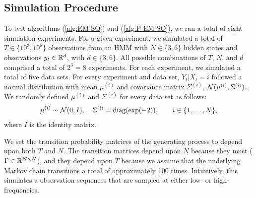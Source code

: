 
\subsection{Simulation Procedure}

To test algorithms (\ref{alg:EM-SO}) and (\ref{alg:P-EM-SO}), we ran a total of eight simulation experiments. For a given experiment, we simulated a total of $T \in \{10^3,10^5\}$ observations from an HMM with $N \in \{3,6\}$ hidden states and observations $y_t \in \mathbb{R}^d$, with $d \in \{3,6\}$. All possible combinations of $T$, $N$, and $d$ comprised a total of $2^3 = 8$ experiments. For each experiment, we simulated a total of five data sets. For every experiment and data set, $Y_t | X_t = i$ followed a normal distribution with mean $\mu^{(i)}$ and covariance matrix $\Sigma^{(i)}$, $\mathcal{N}(\mu^{(i)},\Sigma^{(i)})$. We randomly defined $\mu^{(i)}$ and $\Sigma^{(i)}$ for every data set as follows:
%
\begin{equation}
    \mu^{(i)} \sim \mathcal{N}(0,I), \quad \Sigma^{(i)} = \text{diag}(\exp(-2)), \qquad i \in \{1,\ldots,N\},
\end{equation}
%
where $I$ is the identity matrix.

We set the transition probability matrices of the generating process to depend upon both $T$ and $N$. The transition matrices depend upon $N$ because they must ($\Gamma \in \mathbb{R}^{N \times N}$), and they depend upon $T$ because we assume that the underlying Markov chain transitions a total of approximately 100 times. Intuitively, this simulates a observation sequences that are sampled at either low- or high- frequencies.

